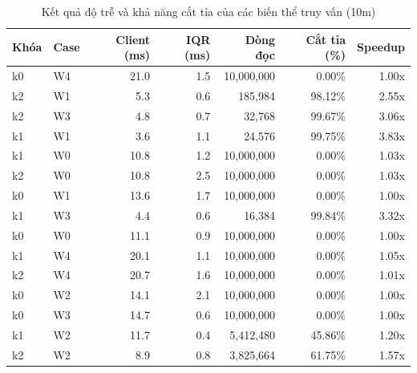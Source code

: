 \begin{table}[htbp]
\centering
\caption{Kết quả độ trễ và khả năng cắt tỉa của các biến thể truy vấn (10m)}
\label{tab:queries_10m}
\begin{tabular}{llrrrrr}
\toprule
\textbf{Khóa} & \textbf{Case} & \textbf{Client (ms)} & \textbf{IQR (ms)} & \textbf{Dòng đọc} & \textbf{Cắt tỉa (\%)} & \textbf{Speedup} \\
\midrule
    k0 & W4 & 21.0 & 1.5 & 10,000,000 & 0.00\% & 1.00x \\
    k2 & W1 & 5.3 & 0.6 & 185,984 & 98.12\% & 2.55x \\
    k2 & W3 & 4.8 & 0.7 & 32,768 & 99.67\% & 3.06x \\
    k1 & W1 & 3.6 & 1.1 & 24,576 & 99.75\% & 3.83x \\
    k1 & W0 & 10.8 & 1.2 & 10,000,000 & 0.00\% & 1.03x \\
    k2 & W0 & 10.8 & 2.5 & 10,000,000 & 0.00\% & 1.03x \\
    k0 & W1 & 13.6 & 1.7 & 10,000,000 & 0.00\% & 1.00x \\
    k1 & W3 & 4.4 & 0.6 & 16,384 & 99.84\% & 3.32x \\
    k0 & W0 & 11.1 & 0.9 & 10,000,000 & 0.00\% & 1.00x \\
    k1 & W4 & 20.1 & 1.1 & 10,000,000 & 0.00\% & 1.05x \\
    k2 & W4 & 20.7 & 1.6 & 10,000,000 & 0.00\% & 1.01x \\
    k0 & W2 & 14.1 & 2.1 & 10,000,000 & 0.00\% & 1.00x \\
    k0 & W3 & 14.7 & 0.6 & 10,000,000 & 0.00\% & 1.00x \\
    k1 & W2 & 11.7 & 0.4 & 5,412,480 & 45.86\% & 1.20x \\
    k2 & W2 & 8.9 & 0.8 & 3,825,664 & 61.75\% & 1.57x \\
\bottomrule
\end{tabular}
\end{table}
